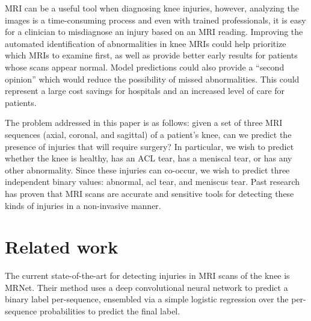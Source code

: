 \documentclass[10pt,twocolumn,letterpaper]{article}
\begin{document}
MRI can be a useful tool when diagnosing knee injuries\cite{orlando2015diagnosis,figueiredo2018use,smith2012diagnostic}, however, analyzing the images is a time-consuming process and even with trained professionals, it is easy for a clinician to misdiagnose an injury based on an MRI reading\cite{kolata2011}. Improving the automated identification of abnormalities in knee MRIs could help prioritize which MRIs to examine first, as well as provide better early results for patients whose scans appear normal. Model predictions could also provide a ``second opinion'' which would reduce the possibility of missed abnormalities. This could represent a large cost savings for hospitals and an increased level of care for patients.

The problem addressed in this paper is as follows: given a set of three MRI sequences (axial, coronal, and sagittal) of a patient's knee, can we predict the presence of injuries that will require surgery? In particular, we wish to predict whether the knee is healthy, has an ACL tear, has a meniscal tear, or has any other abnormality. Since these injuries can co-occur, we wish to predict three independent binary values: abnormal, acl tear, and meniscus tear. Past research has proven that MRI scans are accurate and sensitive tools for detecting these kinds of injuries in a non-invasive manner\cite{boeve1991magnetic,felli2016comparison,yaqoob2015diagnostic}.


\section{Related work}
\label{related-work} %

The current state-of-the-art for detecting injuries in MRI scans of the knee is MRNet\cite{bien2018deep}. Their method uses a deep convolutional neural network to predict a binary label per-sequence, ensembled via a simple logistic regression over the per-sequence probabilities to predict the final label.
\end{document}
